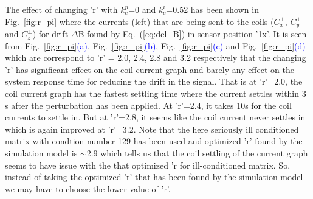 The effect of changing 'r' with $k_c^p$=0 and $k_c^i$=0.52 has been shown in Fig.~\ref{fig:r_pi} where the currents (left) that are being sent to the coils ($C_x^\pm$, $C_y^\pm$ and $C_z^\pm$) for drift $\Delta$B found by Eq.~(\ref{eq:del_B}) in sensor position '1x'.  It is seen from Fig.~\ref{fig:r_pi}\textcolor{blue}{(a)}, Fig.~\ref{fig:r_pi}\textcolor{blue}{(b)}, Fig.~\ref{fig:r_pi}\textcolor{blue}{(c)} and Fig.~\ref{fig:r_pi}\textcolor{blue}{(d)} which are correspond to 'r' = 2.0, 2.4, 2.8 and 3.2 respectively that the changing 'r' has significant effect on the coil current graph and barely any effect on the system response time for reducing the drift in the signal. That is at 'r'=2.0, the coil current graph has the fastest settling time where the current settles within 3 s after the perturbation has been applied. At 'r'=2.4, it takes 10s for the coil currents to settle in. But at 'r'=2.8, it seems like the coil current never settles in which is again improved at 'r'=3.2. Note that the here seriously ill conditioned matrix with condtion number 129 has been used and optimized 'r' found by the simulation model is $\sim$2.9 which tells us that the coil settling of the current graph seems to have issue with the that optimized 'r for ill-conditioned matrix. So, instead of taking the optimized 'r' that has been found by the simulation model we may have to choose the lower value of 'r'. 

